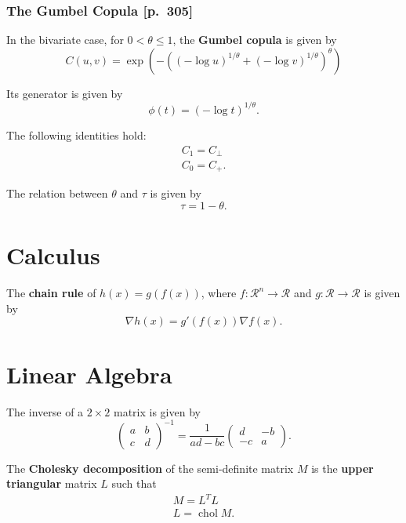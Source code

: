 \documentclass[10pt]{article}
\newcommand{\real}{\mathscr{R}}
\newcommand{\grad}{\nabla}
\DeclareMathOperator{\chol}{chol}
\begin{document}
\subsubsection{The Gumbel Copula [p.~305]}
\begin{outline}
  \1 In the bivariate case, for $0<\theta\leq1$, the \textbf{Gumbel copula} is given by
  \begin{equation*}
    C(u,v) = \exp(-((-\log u)^{1/\theta} + (-\log v)^{1/\theta})^\theta)
  \end{equation*}

  \1 Its generator is given by
  \begin{equation*}
    \phi(t) = (-\log t)^{1/\theta}.
  \end{equation*}

  \1 The following identities hold:
  \begin{gather*}
    C_1 = C_\perp\\
    C_0 = C_{+}.
  \end{gather*}

  \1 The relation between $\theta$ and $\tau$ is given by
  \begin{equation*}
    \tau = 1-\theta.
  \end{equation*}
\end{outline}


\section{Calculus}
\begin{outline}
\1 The \textbf{chain rule} of $h(x) = g(f(x))$, where $f:\real^n\to\real$ and
$g:\real\to\real$ is given by
\begin{equation*}
\grad h(x) = g'(f(x))\grad f(x).  
\end{equation*}
\end{outline}


\section{Linear Algebra}
\begin{outline}
  \1 The inverse of a $2\times2$ matrix is given by
  \begin{equation*}
    \begin{pmatrix}a&b\\c&d\end{pmatrix}^{-1} = \frac{1}{ad-bc}\begin{pmatrix}d&-b\\-c&a\end{pmatrix}.
  \end{equation*}

  \1 The \textbf{Cholesky decomposition} of the semi-definite matrix $M$ is the
  \textbf{upper triangular} matrix $L$ such that
  \begin{gather*}
    M = L^TL\\
    L = \chol M.
  \end{gather*}
\end{outline}
\end{document}
